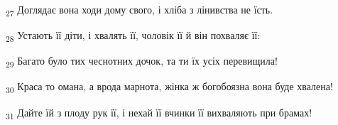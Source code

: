 \begin{tcolorbox}
\textsubscript{27} Доглядає вона ходи дому свого, і хліба з лінивства не їсть.
\end{tcolorbox}
\begin{tcolorbox}
\textsubscript{28} Устають її діти, і хвалять її, чоловік її й він похваляє її:
\end{tcolorbox}
\begin{tcolorbox}
\textsubscript{29} Багато було тих чеснотних дочок, та ти їх усіх перевищила!
\end{tcolorbox}
\begin{tcolorbox}
\textsubscript{30} Краса то омана, а врода марнота, жінка ж богобоязна вона буде хвалена!
\end{tcolorbox}
\begin{tcolorbox}
\textsubscript{31} Дайте їй з плоду рук її, і нехай її вчинки її вихваляють при брамах!
\end{tcolorbox}
